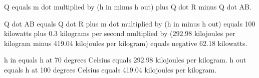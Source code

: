 Q equals m dot multiplied by (h in minus h out) plus Q dot R minus Q dot AB.  

Q dot AB equals Q dot R plus m dot multiplied by (h in minus h out) equals 100 kilowatts plus 0.3 kilograms per second multiplied by (292.98 kilojoules per kilogram minus 419.04 kilojoules per kilogram) equals negative 62.18 kilowatts.  

h in equals h at 70 degrees Celsius equals 292.98 kilojoules per kilogram.  
h out equals h at 100 degrees Celsius equals 419.04 kilojoules per kilogram.